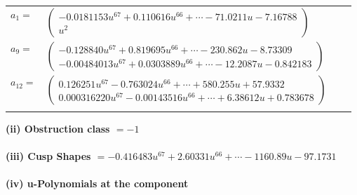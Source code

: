 \documentclass[1p]{elsarticle_modified}
\theoremstyle{definition}
\begin{document}
\begin{tabular}{m{7pt} m{180pt} m{7pt} m{180pt} }
\flushright $a_{1}=$&$\begin{pmatrix}-0.0181153 u^{67}+0.110616 u^{66}+\cdots-71.0211 u-7.16788\\u^2\end{pmatrix}$ \\
\flushright $a_{9}=$&$\begin{pmatrix}-0.128840 u^{67}+0.819695 u^{66}+\cdots-230.862 u-8.73309\\-0.00484013 u^{67}+0.0303889 u^{66}+\cdots-12.2087 u-0.842183\end{pmatrix}$ \\
\flushright $a_{12}=$&$\begin{pmatrix}0.126251 u^{67}-0.763024 u^{66}+\cdots+580.255 u+57.9332\\0.000316220 u^{67}-0.00143516 u^{66}+\cdots+6.38612 u+0.783678\end{pmatrix}$\\&\end{tabular}
\flushleft \textbf{(ii) Obstruction class $= -1$}\\~\\
\flushleft \textbf{(iii) Cusp Shapes $= -0.416483 u^{67}+2.60331 u^{66}+\cdots-1160.89 u-97.1731$}\\~\\
\newpage\renewcommand{\arraystretch}{1}
\flushleft \textbf{(iv) u-Polynomials at the component}\newline \\
\end{document}
